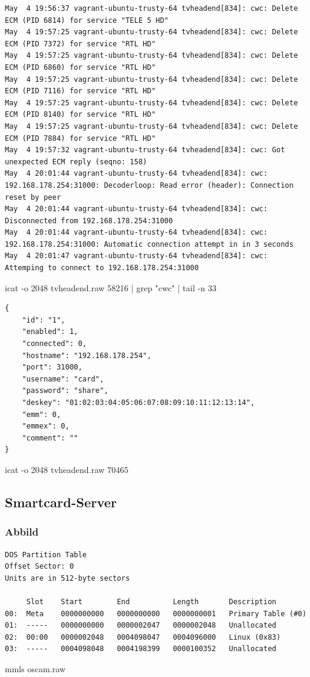 \begin{cmd}
\begin{Verbatim}[fontsize=\tiny]
May  4 19:56:37 vagrant-ubuntu-trusty-64 tvheadend[834]: cwc: Delete ECM (PID 6814) for service "TELE 5 HD"
May  4 19:57:25 vagrant-ubuntu-trusty-64 tvheadend[834]: cwc: Delete ECM (PID 7372) for service "RTL HD"
May  4 19:57:25 vagrant-ubuntu-trusty-64 tvheadend[834]: cwc: Delete ECM (PID 6860) for service "RTL HD"
May  4 19:57:25 vagrant-ubuntu-trusty-64 tvheadend[834]: cwc: Delete ECM (PID 7116) for service "RTL HD"
May  4 19:57:25 vagrant-ubuntu-trusty-64 tvheadend[834]: cwc: Delete ECM (PID 8140) for service "RTL HD"
May  4 19:57:25 vagrant-ubuntu-trusty-64 tvheadend[834]: cwc: Delete ECM (PID 7884) for service "RTL HD"
May  4 19:57:32 vagrant-ubuntu-trusty-64 tvheadend[834]: cwc: Got unexpected ECM reply (seqno: 158)
May  4 20:01:44 vagrant-ubuntu-trusty-64 tvheadend[834]: cwc: 192.168.178.254:31000: Decoderloop: Read error (header): Connection reset by peer
May  4 20:01:44 vagrant-ubuntu-trusty-64 tvheadend[834]: cwc: Disconnected from 192.168.178.254:31000
May  4 20:01:44 vagrant-ubuntu-trusty-64 tvheadend[834]: cwc: 192.168.178.254:31000: Automatic connection attempt in in 3 seconds
May  4 20:01:47 vagrant-ubuntu-trusty-64 tvheadend[834]: cwc: Attemping to connect to 192.168.178.254:31000
\end{Verbatim}
\caption{icat -o 2048 tvheadend.raw 58216 | grep "cwc" | tail -n 33}
\label{cmd:tvheadend-cwclog}
\end{cmd}

\begin{cmd}
\begin{verbatim}
{
	"id": "1",
	"enabled": 1,
	"connected": 0,
	"hostname": "192.168.178.254",
	"port": 31000,
	"username": "card",
	"password": "share",
	"deskey": "01:02:03:04:05:06:07:08:09:10:11:12:13:14",
	"emm": 0,
	"emmex": 0,
	"comment": ""
}
\end{verbatim}
\caption{icat -o 2048 tvheadend.raw 70465}
\label{cmd:tvheadend-cwc}
\end{cmd}


\subsection{Smartcard-Server}

\subsubsection{Abbild}

\begin{cmd}[H]
\begin{verbatim}
DOS Partition Table
Offset Sector: 0
Units are in 512-byte sectors

     Slot    Start        End          Length       Description
00:  Meta    0000000000   0000000000   0000000001   Primary Table (#0)
01:  -----   0000000000   0000002047   0000002048   Unallocated
02:  00:00   0000002048   0004098047   0004096000   Linux (0x83)
03:  -----   0004098048   0004198399   0000100352   Unallocated
\end{verbatim}
\caption{mmls oscam.raw}
\label{cmd:oscam-mmls}
\end{cmd}

